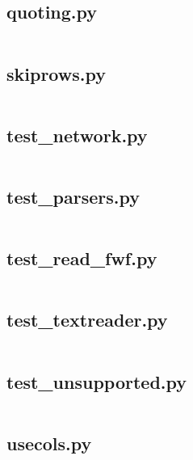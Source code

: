 \documentclass{article}
\begin{document}
\subsection{quoting.py}
\inputminted{python}{/home/dufferzafar/dev/@clones/pandas/pandas/tests/io/parser/quoting.py}
\newpage

\subsection{skiprows.py}
\inputminted{python}{/home/dufferzafar/dev/@clones/pandas/pandas/tests/io/parser/skiprows.py}
\newpage

\subsection{test\_network.py}
\inputminted{python}{/home/dufferzafar/dev/@clones/pandas/pandas/tests/io/parser/test_network.py}
\newpage

\subsection{test\_parsers.py}
\inputminted{python}{/home/dufferzafar/dev/@clones/pandas/pandas/tests/io/parser/test_parsers.py}
\newpage

\subsection{test\_read\_fwf.py}
\inputminted{python}{/home/dufferzafar/dev/@clones/pandas/pandas/tests/io/parser/test_read_fwf.py}
\newpage

\subsection{test\_textreader.py}
\inputminted{python}{/home/dufferzafar/dev/@clones/pandas/pandas/tests/io/parser/test_textreader.py}
\newpage

\subsection{test\_unsupported.py}
\inputminted{python}{/home/dufferzafar/dev/@clones/pandas/pandas/tests/io/parser/test_unsupported.py}
\newpage

\subsection{usecols.py}
\inputminted{python}{/home/dufferzafar/dev/@clones/pandas/pandas/tests/io/parser/usecols.py}
\newpage
\end{document}
